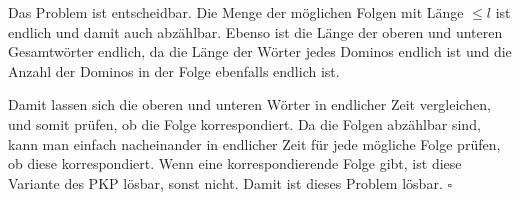 Das Problem ist entscheidbar. Die Menge der möglichen Folgen mit Länge $\leq l$
ist endlich und damit auch abzählbar. Ebenso ist die Länge der oberen und
unteren Gesamtwörter endlich, da die Länge der Wörter jedes Dominos endlich ist
und die Anzahl der Dominos in der Folge ebenfalls endlich ist.

Damit lassen sich die oberen und unteren Wörter in endlicher Zeit vergleichen,
und somit prüfen, ob die Folge korrespondiert. Da die Folgen abzählbar sind,
kann man einfach nacheinander in endlicher Zeit für jede mögliche Folge prüfen,
ob diese korrespondiert. Wenn eine korrespondierende Folge gibt, ist diese
Variante des PKP lösbar, sonst nicht. Damit ist dieses Problem lösbar.
\hfill$\square$
